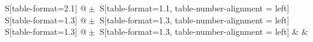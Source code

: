 \begin{table}
    \centering
    \caption{Messdaten der Metallprobe.}
    \label{table:A1}
    \begin{tabular}{
	S[table-format=2.1]
	@{${}\pm{}$}
	S[table-format=1.1, table-number-alignment = left]
	S[table-format=1.3]
	@{${}\pm{}$}
	S[table-format=1.3, table-number-alignment = left]
	S[table-format=1.3]
	@{${}\pm{}$}
	S[table-format=1.3, table-number-alignment = left]
	}
	\toprule
			& 		&
    		\\ 
	\midrule
    
    \bottomrule
    \end{tabular}
    \end{table}
